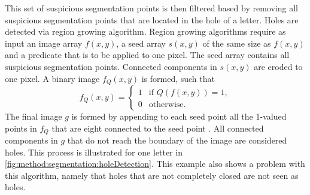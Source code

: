 	This set of suspicious segmentation points is then filtered based by removing all suspicious segmentation points that are located in the hole of a letter. Holes are detected via region growing algorithm. Region growing algorithms require as input an image array $f(x,y)$, a seed array $s(x,y)$ of the same size as $f(x,y)$ and a predicate that is to be applied to one pixel. The seed array contains all suspicious segmentation points. Connected components in $s(x,y)$ are eroded to one pixel. A binary image $f_Q(x,y)$ is formed, such that
	\begin{equation*}
		f_Q(x,y) = 
		\begin{cases}
			1 & \text{if }Q(f(x,y)) = 1,\\
			0 & \text{otherwise.}
		\end{cases}
	\end{equation*}
	The final image $g$ is formed by appending to each seed point all the 1-valued points in $f_Q$ that are eight connected to the seed point \cite{gonzalez2002digitalCh10}. All connected components in $g$ that do not reach the boundary of the image are considered holes. This process is illustrated for one letter in \cref{fig:method:segmentation:holeDetection}. This example also shows a problem with this algorithm, namely that holes that are not completely closed are not seen as holes. 


